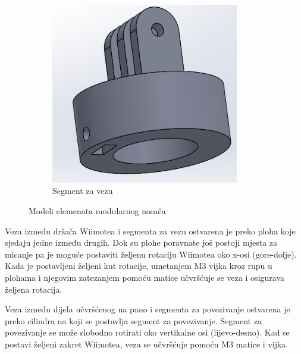 \documentclass[times, utf8, diplomski]{fer}
\begin{document}
\begin{figure}[h]
\begin{subfigure}[b]{.3\textwidth}
	\includegraphics[width=0.9\textwidth]{drzac}
	\caption{Segment za vezu}
	\label{fig:veza}
\end{subfigure}
\caption{Modeli elemenata modularnog nosača}
\label{fig:elementi}
\end{figure}

Veza između držača Wiimotea i segmenta za vezu ostvarena je preko ploha koje sjedaju jedne između drugih. Dok su plohe poravnate još postoji mjesta za micanje pa je moguće postaviti željenu rotaciju Wiimotea oko x-osi (gore-dolje). Kada je postavljeni željeni kut rotacije, umetanjem M3 vijka kroz rupu u plohama i njegovim zatezanjem pomoću matice učvršćuje se veza i osigurava željena rotacija.

Veza između dijela učvršćenog na pano i segmenta za povezivanje ostvarena je preko cilindra na koji se postavlja segment za povezivanje. Segment za povezivanje se može slobodno rotirati oko vertikalne osi (lijevo-desno). Kad se postavi željeni zakret Wiimotea, veza se učvršćuje pomoću M3 matice i vijka. 
\end{document}

